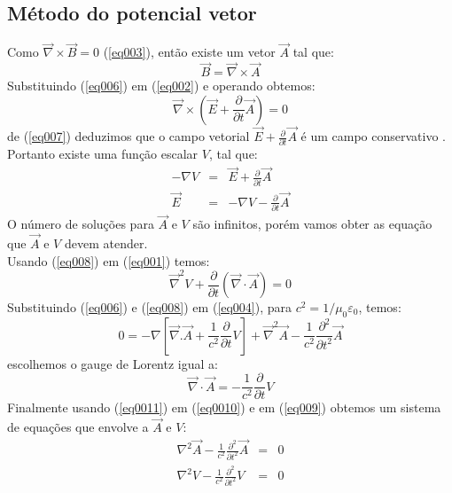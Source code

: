 \subsection{M\'etodo do potencial vetor}
Como $\vec{\nabla}\times\vec{B}=0$ (\ref{eq003}), ent\~ao existe um vetor $\vec{A}$ tal que:
\begin{equation}\label{eq006}
\vec{B}=\vec{\nabla}\times\vec{A}
\end{equation}
Substituindo (\ref{eq006}) em (\ref{eq002}) e operando obtemos:
\begin{equation}\label{eq007}
\vec{\nabla}\times(\vec{E}+\frac{\partial}{\partial t}\vec{A})=0
\end{equation}
de (\ref{eq007}) deduzimos que o campo vetorial $\vec{E}+\frac{\partial}{\partial t}\vec{A}$ \'e um campo conservativo \cite{Lya:32}\cite{Lya:33}. Portanto existe uma fun\c{c}\~ao escalar $V$, tal que:
\begin{eqnarray}
-\nabla V &=& \vec{E}+\frac{\partial}{\partial t}\vec{A}\nonumber\\
\vec{E}&=&-\nabla V- \frac{\partial }{\partial t}\vec{A} \label{eq008}
\end{eqnarray}
O n\'umero de solu\c{c}\~oes para $\vec{A}$ e $V$ s\~ao infinitos, por\'em vamos obter as equa\c{c}\~ao que $\vec{A}$ e $V$ devem atender.\\
Usando (\ref{eq008}) em (\ref{eq001}) temos:
\begin{equation}\label{eq009}
\vec{\nabla}^2V+\frac{\partial}{\partial t}(\vec{\nabla}\cdot\vec{A}) = 0
\end{equation}
Substituindo (\ref{eq006}) e (\ref{eq008}) em (\ref{eq004}), para $c^2=1/\mu_0\varepsilon_0$, temos:
\begin{equation}\label{eq0010}
0=-\nabla[\vec{\nabla}.\vec{A} + \frac{1}{c^2}\frac{\partial }{\partial t}V]+ \vec{\nabla}^2\vec{A}-\frac{1}{c^2}\frac{\partial^2}{\partial t^2}\vec{A}
\end{equation}
escolhemos o gauge de Lorentz igual a:
\begin{equation}\label{eq0011}
\vec{\nabla}\cdot\vec{A}=- \frac{1}{c^2}\frac{\partial }{\partial t}V
\end{equation}
Finalmente usando (\ref{eq0011}) em (\ref{eq0010}) e em (\ref{eq009}) obtemos um sistema de equa\c{c}\~oes que envolve a $\vec{A}$ e $V$:
\begin{eqnarray}
\nabla^{2}\vec{A} - \frac{1}{c^2}\frac{\partial ^2}{\partial t^2}\vec{ A}&=& 0\label{eq0012}\\
\nabla^{2}V - \frac{1}{c^2}\frac{\partial ^2}{\partial t^2}V &=& 0\label{eq0013}
\end{eqnarray}
